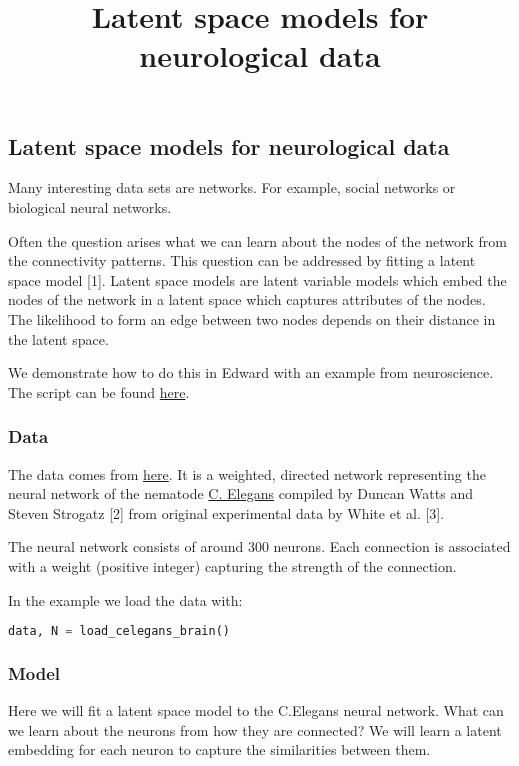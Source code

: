 \title{Latent space models for neurological data}

\subsection{Latent space models for neurological data}

Many interesting data sets are networks. For example, social networks or biological neural networks.

Often the question arises what we can learn about the nodes of the network from the connectivity patterns. This question can be addressed by fitting a latent space model [1].
Latent space models are latent variable models which embed the nodes of the network in a latent space which captures attributes of the nodes. The likelihood to form an edge between two nodes depends on their distance in the latent space.

We demonstrate how to do this in Edward with an example from neuroscience. The script can be found \href{https://github.com/blei-lab/edward/blob/master/examples/latent_space_model.py}{here}.

\subsubsection{Data}

The data comes from \href{http://www-personal.umich.edu/~mejn/netdata/}{here}.
It is a weighted, directed network representing the neural network of the nematode \href{https://en.wikipedia.org/wiki/Caenorhabditis_elegans}{C. Elegans} compiled by Duncan Watts and Steven Strogatz [2] from original experimental data by White et al. [3].

The neural network consists of around $300$ neurons. Each connection is associated with a weight (positive integer) capturing the strength of the connection.

In the example we load the data with:
\begin{lstlisting}[language=Python]
data, N = load_celegans_brain()
\end{lstlisting}

\subsubsection{Model}

Here we will fit a latent space model to the C.Elegans neural network. What can we learn about the neurons from how they are connected? We will learn a latent embedding for each neuron to capture the similarities between them.

